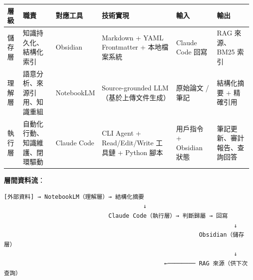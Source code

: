 {\def\LTcaptype{none} %
\begin{longtable}[]{@{}
  >{\raggedright\arraybackslash}p{}
  >{\raggedright\arraybackslash}p{}
  >{\raggedright\arraybackslash}p{}
  >{\raggedright\arraybackslash}p{}
  >{\raggedright\arraybackslash}p{}
  >{\raggedright\arraybackslash}p{}@{}}
\toprule\noalign{}
\begin{minipage}[b]{\linewidth}\raggedright
層級
\end{minipage} & \begin{minipage}[b]{\linewidth}\raggedright
職責
\end{minipage} & \begin{minipage}[b]{\linewidth}\raggedright
對應工具
\end{minipage} & \begin{minipage}[b]{\linewidth}\raggedright
技術實現
\end{minipage} & \begin{minipage}[b]{\linewidth}\raggedright
輸入
\end{minipage} & \begin{minipage}[b]{\linewidth}\raggedright
輸出
\end{minipage} \\
\midrule\noalign{}
\endhead
\bottomrule\noalign{}
\endlastfoot
儲存層 & 知識持久化、結構化索引 & Obsidian & Markdown + YAML Frontmatter
+ 本地檔案系統 & Claude Code 回寫 & RAG 來源、BM25 索引 \\
理解層 & 語意分析、來源引用、知識重組 & NotebookLM & Source-grounded
LLM（基於上傳文件生成） & 原始論文 / 筆記 & 結構化摘要 + 精確引用 \\
執行層 & 自動化行動、知識維護、閉環驅動 & Claude Code & CLI Agent +
Read/Edit/Write 工具鏈 + Python 腳本 & 用戶指令 + Obsidian 狀態 &
筆記更新、審計報告、查詢回答 \\
\end{longtable}
}

\textbf{層間資料流}：

\begin{verbatim}
[外部資料] → NotebookLM（理解層）→ 結構化摘要
                                        ↓
                              Claude Code（執行層）→ 判斷歸屬 → 回寫
                                                                  ↓
                                                        Obsidian（儲存層）
                                                                  ↓
                                              ←──────── RAG 來源（供下次查詢）
\end{verbatim}

